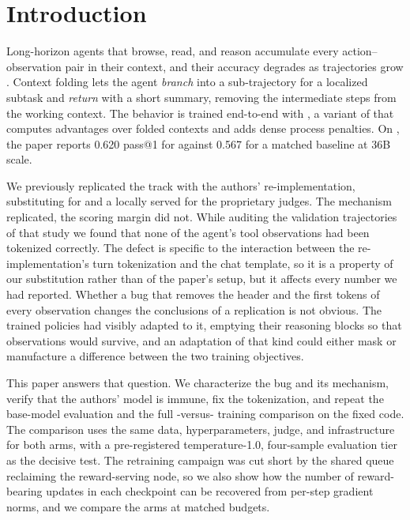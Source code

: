 \section{Introduction}
\label{sec:intro}

Long-horizon agents that browse, read, and reason accumulate every action--observation pair in
their context, and their accuracy degrades as trajectories grow \citep{yao2023react}.
Context folding \citep{sun2025contextfolding} lets the agent \emph{branch} into a
sub-trajectory for a localized subtask and \emph{return} with a short summary, removing the
intermediate steps from the working context. The behavior is trained end-to-end with
\foldgrpo{}, a variant of \grpo{} \citep{shao2024deepseekmath} that computes advantages over
folded contexts and adds dense process penalties. On \bcplus{}
\citep{chen2025browsecompplus}, the paper reports 0.620 pass@1 for \foldgrpo{} against 0.567
for a matched \grpo{} baseline at 36B scale.

We previously replicated the \bcplus{} track with the authors' re-implementation, substituting
\qwen{} \citep{yang2025qwen3} for \seedoss{} and a locally served \judgemodel{}
\citep{openai2025gptoss} for the proprietary judges. The mechanism replicated, the scoring
margin did not. While auditing the validation trajectories of that study we found that none of
the agent's tool observations had been tokenized correctly. The defect is specific to the
interaction between the re-implementation's turn tokenization and the \qwen{} chat template,
so it is a property of our substitution rather than of the paper's setup, but it affects every
number we had reported. Whether a bug that removes the header and the first tokens of every
observation changes the conclusions of a replication is not obvious. The trained policies had
visibly adapted to it, emptying their reasoning blocks so that observations would survive, and
an adaptation of that kind could either mask or manufacture a difference between the two
training objectives.

This paper answers that question. We characterize the bug and its mechanism, verify that the
authors' model is immune, fix the tokenization, and repeat the base-model evaluation and the
full \foldgrpo{}-versus-\grpo{} training comparison on the fixed code. The comparison uses the
same data, hyperparameters, judge, and infrastructure for both arms, with a pre-registered
temperature-1.0, four-sample evaluation tier as the decisive test. The retraining campaign was
cut short by the shared queue reclaiming the reward-serving node, so we also show how the
number of reward-bearing updates in each checkpoint can be recovered from per-step gradient
norms, and we compare the arms at matched budgets.


